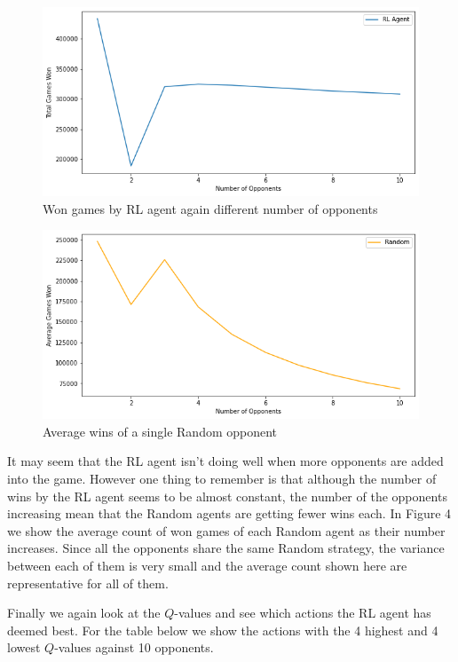 \documentclass[11pt, oneside]{article}   	%
\begin{document}
\begin{figure}[h]
    \centering
    \includegraphics[scale=0.5]{./images/multi_opp_rl.png}
    \caption{Won games by RL agent again different number of opponents}
    \label{fig:mesh1}
\end{figure}

\begin{figure}[h]
    \centering
    \includegraphics[scale=0.5]{./images/multi_opp_random.png}
    \caption{Average wins of a single Random opponent}
    \label{fig:mesh1}
\end{figure}

It may seem that the RL agent isn't doing well when more opponents are added into the game. However one thing to remember is that although the number of wins by the RL agent seems to be almost constant, the number of the opponents increasing mean that the Random agents are getting fewer wins each. In Figure 4 we show the average count of won games of each Random agent as their number increases. Since all the opponents share the same Random strategy, the variance between each of them is very small and the average count shown here are representative for all of them.

\hfill


Finally we again look at the $Q$-values and see which actions the RL agent has deemed best. For the table below we show the actions with the 4 highest and 4 lowest $Q$-values against 10 opponents.
\end{document}
